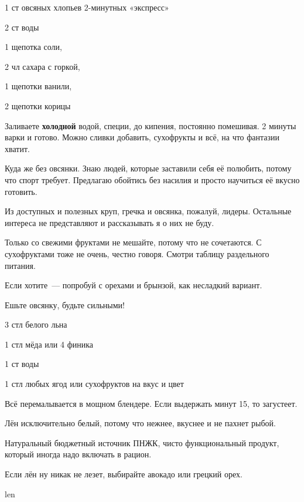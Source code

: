 {
\item 1 ст овсяных хлопьев 2-минутных «экспресс»
\item 2 ст воды 
}{
\item 1 щепотка соли, 
\item 2 чл сахара с горкой, 
\item 1 щепотки ванили, 
\item 2 щепотки корицы
}{
Заливаете \textbf{холодной} водой, специи, до кипения, постоянно помешивая. 2 минуты варки и готово. Можно сливки добавить, сухофрукты и всё, на что фантазии хватит. 
}{
\begin{advice}
\item Куда же без овсянки. Знаю людей, которые заставили себя её полюбить, потому что спорт требует. Предлагаю обойтись без насилия и просто научиться её вкусно готовить.
\item Из доступных и полезных круп, гречка и овсянка, пожалуй, лидеры. Остальные интереса не представляют и рассказывать я о них не буду.
\item Только со свежими фруктами не мешайте, потому что не сочетаются. С сухофруктами тоже не очень, честно говоря. Смотри таблицу раздельного питания. 
    \item Если хотите~--- попробуй с орехами и брынзой, как несладкий вариант.
\item Ешьте овсянку, будьте сильными!
\end{advice}}{}



{
\item 3 стл белого льна
\item 1 стл мёда или 4 финика
\item 1 ст воды
\item 1 стл любых ягод или сухофруктов на вкус и цвет
}{
\item[]
}{
Всё перемалывается в мощном блендере. Если выдержать минут 15, то загустеет.
}{
\begin{advice}
\item Лён исключительно белый, потому что нежнее, вкуснее и не пахнет рыбой. 
\item Натуральный бюджетный источник ПНЖК, чисто функциональный продукт, который иногда надо включать в рацион. 
\item Если лён ну никак не лезет, выбирайте авокадо или грецкий орех.
\end{advice}}{len}




